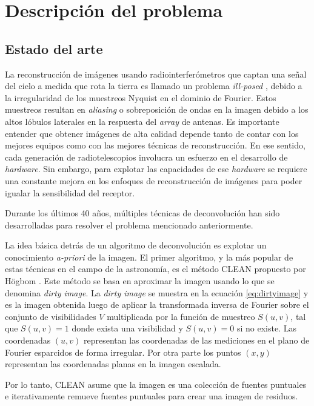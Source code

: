 \section{Descripci\'on del problema}
\label{intro:problema}

\subsection{Estado del arte}
\label{sec:estadodelarte}


La reconstrucción de imágenes usando radiointerferómetros que captan una señal del cielo a medida que rota la tierra es llamado un problema \textit{ill-posed} \citep{chen}, debido a la irregularidad de los muestreos Nyquist en el dominio de Fourier. Estos muestreos resultan en \textit{aliasing} o sobreposición de ondas en la imagen debido a los altos lóbulos laterales en la respuesta del \textit{array} de antenas. Es importante entender que obtener imágenes de alta calidad depende tanto de contar con los mejores equipos como con las mejores técnicas de reconstrucción. En ese sentido, cada generación de radiotelescopios involucra un esfuerzo en el desarrollo de \textit{hardware}. Sin embargo, para explotar las capacidades de ese \textit{hardware} se requiere una constante mejora en los enfoques de reconstrucción de imágenes para poder igualar la sensibilidad del receptor.

Durante los últimos 40 años, múltiples técnicas de deconvolución han sido desarrolladas para resolver el problema mencionado anteriormente.

La idea básica detrás de un algoritmo de deconvolución es explotar un conocimiento \textit{a-priori} de la imagen. El primer algoritmo, y la más popular de estas técnicas en el campo de la astronomía, es el método CLEAN propuesto por Högbom \citep{CLEAN}. Este método se basa en aproximar la imagen usando lo que se denomina \textit{dirty image}. La \textit{dirty image} se muestra en la ecuación \ref{eq:dirtyimage} y es la imagen obtenida luego de aplicar la transformada inversa de Fourier sobre el conjunto de visibilidades $V$ multiplicada por la función de muestreo $S(u,v)$, tal que $S(u,v)=1$ donde exista una visibilidad y $S(u,v)=0$ si no existe. Las coordenadas $(u,v)$ representan las coordenadas de las mediciones en el plano de Fourier esparcidos de forma irregular. Por otra parte los puntos $(x,y)$ representan las coordenadas planas en la imagen escalada.

Por lo tanto, CLEAN asume que la imagen es una colección de fuentes puntuales e iterativamente remueve fuentes puntuales para crear una imagen de residuos.

